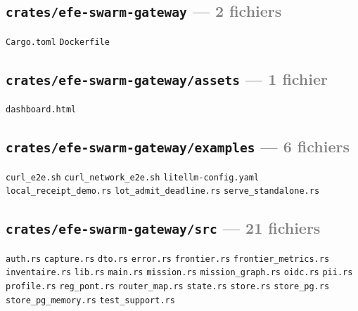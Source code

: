 \documentclass[10pt]{report}
\newcommand{\code}[1]{\texttt{\small #1}}
\begin{document}
\subsection*{\code{crates/efe-swarm-gateway} \normalfont\textcolor{grey}{--- 2 fichiers}}
\begin{sloppypar}\footnotesize\raggedright
\code{Cargo.toml} \;\textbullet\; \code{Dockerfile}
\end{sloppypar}

\subsection*{\code{crates/efe-swarm-gateway/assets} \normalfont\textcolor{grey}{--- 1 fichier}}
\begin{sloppypar}\footnotesize\raggedright
\code{dashboard.html}
\end{sloppypar}

\subsection*{\code{crates/efe-swarm-gateway/examples} \normalfont\textcolor{grey}{--- 6 fichiers}}
\begin{sloppypar}\footnotesize\raggedright
\code{curl\_e2e.sh} \;\textbullet\; \code{curl\_network\_e2e.sh} \;\textbullet\; \code{litellm-config.yaml} \;\textbullet\; \code{local\_receipt\_demo.rs} \;\textbullet\; \code{lot\_admit\_deadline.rs} \;\textbullet\; \code{serve\_standalone.rs}
\end{sloppypar}

\subsection*{\code{crates/efe-swarm-gateway/src} \normalfont\textcolor{grey}{--- 21 fichiers}}
\begin{sloppypar}\footnotesize\raggedright
\code{auth.rs} \;\textbullet\; \code{capture.rs} \;\textbullet\; \code{dto.rs} \;\textbullet\; \code{error.rs} \;\textbullet\; \code{frontier.rs} \;\textbullet\; \code{frontier\_metrics.rs} \;\textbullet\; \code{inventaire.rs} \;\textbullet\; \code{lib.rs} \;\textbullet\; \code{main.rs} \;\textbullet\; \code{mission.rs} \;\textbullet\; \code{mission\_graph.rs} \;\textbullet\; \code{oidc.rs} \;\textbullet\; \code{pii.rs} \;\textbullet\; \code{profile.rs} \;\textbullet\; \code{reg\_pont.rs} \;\textbullet\; \code{router\_map.rs} \;\textbullet\; \code{state.rs} \;\textbullet\; \code{store.rs} \;\textbullet\; \code{store\_pg.rs} \;\textbullet\; \code{store\_pg\_memory.rs} \;\textbullet\; \code{test\_support.rs}
\end{sloppypar}
\end{document}
